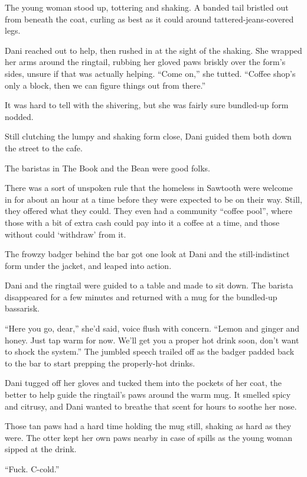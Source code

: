 The young woman stood up, tottering and shaking. A banded tail bristled out from beneath the coat, curling as best as it could around tattered-jeans-covered legs.

Dani reached out to help, then rushed in at the sight of the shaking. She wrapped her arms around the ringtail, rubbing her gloved paws briskly over the form's sides, unsure if that was actually helping. ``Come on,'' she tutted. ``Coffee shop's only a block, then we can figure things out from there.''

It was hard to tell with the shivering, but she was fairly sure bundled-up form nodded.

Still clutching the lumpy and shaking form close, Dani guided them both down the street to the cafe.

\secdiv{}

\noindent The baristas in The Book and the Bean were good folks.

There was a sort of unspoken rule that the homeless in Sawtooth were welcome in for about an hour at a time before they were expected to be on their way. Still, they offered what they could. They even had a community ``coffee pool'', where those with a bit of extra cash could pay into it a coffee at a time, and those without could `withdraw' from it.

The frowzy badger behind the bar got one look at Dani and the still-indistinct form under the jacket, and leaped into action.

Dani and the ringtail were guided to a table and made to sit down. The barista disappeared for a few minutes and returned with a mug for the bundled-up bassarisk.

``Here you go, dear,'' she'd said, voice flush with concern. ``Lemon and ginger and honey. Just tap warm for now. We'll get you a proper hot drink soon, don't want to shock the system.'' The jumbled speech trailed off as the badger padded back to the bar to start prepping the properly-hot drinks.

Dani tugged off her gloves and tucked them into the pockets of her coat, the better to help guide the ringtail's paws around the warm mug. It smelled spicy and citrusy, and Dani wanted to breathe that scent for hours to soothe her nose.

Those tan paws had a hard time holding the mug still, shaking as hard as they were. The otter kept her own paws nearby in case of spills as the young woman sipped at the drink.

``Fuck. C-cold.''

